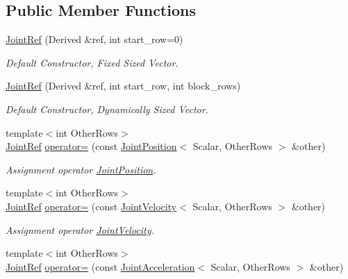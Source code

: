 \subsection*{Public Member Functions}
\begin{DoxyCompactItemize}
\item 
\hyperlink{classow__core_1_1JointRef_af9182248d2b9db614338a8a41931ca1b}{Joint\+Ref} (Derived \&ref, int start\+\_\+row=0)
\begin{DoxyCompactList}\small\item\em Default Constructor, Fixed Sized Vector. \end{DoxyCompactList}\item 
\hyperlink{classow__core_1_1JointRef_ac828577b47096fadbbb401a70012fecd}{Joint\+Ref} (Derived \&ref, int start\+\_\+row, int block\+\_\+rows)
\begin{DoxyCompactList}\small\item\em Default Constructor, Dynamically Sized Vector. \end{DoxyCompactList}\item 
{\footnotesize template$<$int Other\+Rows$>$ }\\\hyperlink{classow__core_1_1JointRef}{Joint\+Ref} \hyperlink{classow__core_1_1JointRef_aa7c575850d9bbe0fc1ad50a9b0fe61e2}{operator=} (const \hyperlink{classow__core_1_1JointPosition}{Joint\+Position}$<$ Scalar, Other\+Rows $>$ \&other)\hypertarget{classow__core_1_1JointRef_aa7c575850d9bbe0fc1ad50a9b0fe61e2}{}\label{classow__core_1_1JointRef_aa7c575850d9bbe0fc1ad50a9b0fe61e2}

\begin{DoxyCompactList}\small\item\em Assignment operator \hyperlink{classow__core_1_1JointPosition}{Joint\+Position}. \end{DoxyCompactList}\item 
{\footnotesize template$<$int Other\+Rows$>$ }\\\hyperlink{classow__core_1_1JointRef}{Joint\+Ref} \hyperlink{classow__core_1_1JointRef_ac1991d9b0cbc8018e6c249860caa13cb}{operator=} (const \hyperlink{classow__core_1_1JointVelocity}{Joint\+Velocity}$<$ Scalar, Other\+Rows $>$ \&other)\hypertarget{classow__core_1_1JointRef_ac1991d9b0cbc8018e6c249860caa13cb}{}\label{classow__core_1_1JointRef_ac1991d9b0cbc8018e6c249860caa13cb}

\begin{DoxyCompactList}\small\item\em Assignment operator \hyperlink{classow__core_1_1JointVelocity}{Joint\+Velocity}. \end{DoxyCompactList}\item 
{\footnotesize template$<$int Other\+Rows$>$ }\\\hyperlink{classow__core_1_1JointRef}{Joint\+Ref} \hyperlink{classow__core_1_1JointRef_ab026b36beb862adfccbea3142d71b9fa}{operator=} (const \hyperlink{classow__core_1_1JointAcceleration}{Joint\+Acceleration}$<$ Scalar, Other\+Rows $>$ \&other)\hypertarget{classow__core_1_1JointRef_ab026b36beb862adfccbea3142d71b9fa}{}\label{classow__core_1_1JointRef_ab026b36beb862adfccbea3142d71b9fa}


\end{DoxyCompactItemize}
